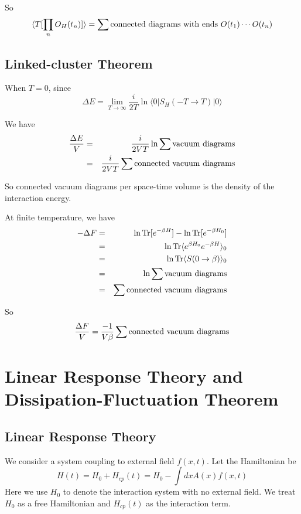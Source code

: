 \documentclass[12pt]{book}
\DeclareMathOperator{\Tr}{Tr}
\begin{document}
	So
	\begin{equation}
		\langle T[\prod_nO_H(t_n)]\rangle=\sum {\rm connected\ diagrams\ with\ ends\ }O(t_1)\cdots O(t_n)
	\end{equation}
	
	\section{Linked-cluster Theorem}
	When $T=0$, since
	\begin{equation}
		\Delta E=\lim_{T\rightarrow\infty}\frac i{2T}\ln\langle 0|S_H(-T\rightarrow T)|0\rangle
	\end{equation}
	
	We have
	\begin{eqnarray}
		\frac{\Delta E}V&=&\frac i{2VT}\ln\sum{\rm vacuum\ diagrams}\\
		&=&\frac i{2VT}\sum{\rm connected\ vacuum\ diagrams}
	\end{eqnarray}
	
	So connected vacuum diagrams per space-time volume is the density of the interaction energy.
	
	At finite temperature, we have
	\begin{eqnarray}
		-\Delta F&=&\ln\Tr[e^{-\beta H}]-\ln\Tr[e^{-\beta H_0}]\\
		&=&\ln\Tr\langle e^{\beta H_0}e^{-\beta H}\rangle_0\\
		&=&\ln\Tr\langle S(0\rightarrow\beta)\rangle_0\\
		&=&\ln\sum{\rm vacuum\ diagrams}\\
		&=&\sum{\rm connected\ vacuum\ diagrams}
	\end{eqnarray}
	
	So
	\begin{equation}
		\frac{\Delta F}{V}=\frac {-1}{V\beta}\sum{\rm connected\ vacuum\ diagrams}
	\end{equation}
	
\chapter{Linear Response Theory and Dissipation-Fluctuation Theorem}

\section{Linear Response Theory}

We consider a system coupling to external field $f(x,t)$. Let the Hamiltonian be
\begin{equation}
	H(t)=H_0+H_{cp}(t)=H_0-\int dxA(x)f(x,t)
\end{equation}
Here we use $H_0$ to denote the interaction system with no external field. We treat $H_0$ as a free Hamiltonian and $H_{cp}(t)$ as the interaction term.
\end{document}

